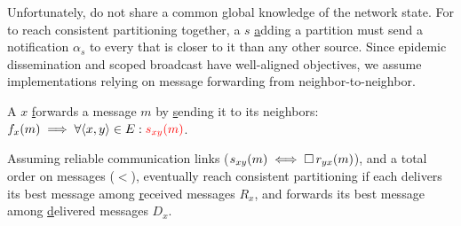 Unfortunately, \processes do not share a common global knowledge of
the network state. For \processes to reach consistent partitioning
together, a \Process $s$ \underline{a}dding a partition must send a
notification $\alpha_s$ to every \process that is closer to it than
any other source. Since epidemic dissemination and scoped broadcast
have well-aligned objectives, we assume implementations relying on
message forwarding from neighbor-to-neighbor.

\begin{definition}
  A \process $x$ \underline{f}orwards a message $m$ by
  \underline{s}ending it to its neighbors:
  $f_x(m) \implies \forall \langle x, y\rangle \in E:
  \textcolor{red}{s_{xy}(m)}$.
\end{definition}

\begin{theorem}
    Assuming reliable communication links ($s_{xy}(m) \iff \square\,
    r_{yx}(m)$), and a total order on messages ($<$), \processes
    eventually reach consistent partitioning if each \process delivers
    its best message among \underline{r}eceived messages $R_x$, and
    forwards its best message among \underline{d}elivered messages
    $D_x$.
\end{theorem}



